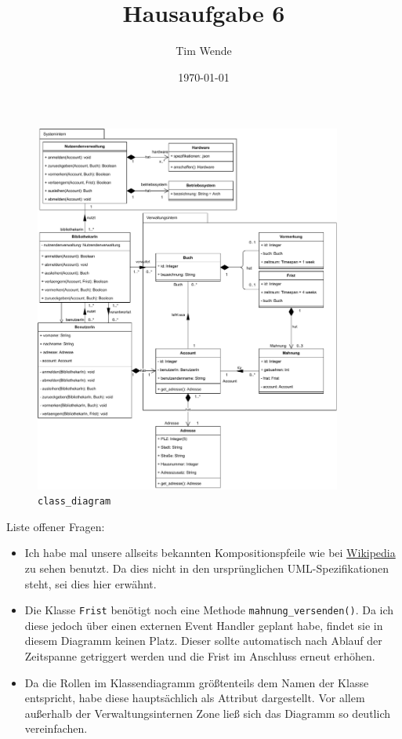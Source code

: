\documentclass{article}
\author{Tim Wende}
\date{\today}
\title{\textbf{Hausaufgabe 6}}
\begin{document}
    \maketitle

    \begin{figure}[ht]
        \includegraphics[width=0.9\textwidth]{swt_wende_tim_h06_class_diagram.pdf}
        \caption{\texttt{class\_diagram}}
    \end{figure}

    \newpage
    Liste offener Fragen:
    \begin{itemize}
        \item Ich habe mal unsere allseits bekannten Kompositionspfeile wie bei \href{https://de.wikipedia.org/wiki/Klassendiagramm}{Wikipedia} zu sehen benutzt.
            Da dies nicht in den ursprünglichen UML-Spezifikationen steht, sei dies hier erwähnt.
        \item Die Klasse \texttt{Frist} benötigt noch eine Methode \texttt{mahnung\_versenden()}.
            Da ich diese jedoch über einen externen Event Handler geplant habe, findet sie in diesem Diagramm keinen Platz.
            Dieser sollte automatisch nach Ablauf der Zeitspanne getriggert werden und die Frist im Anschluss erneut erhöhen.
        \item Da die Rollen im Klassendiagramm größtenteils dem Namen der Klasse entspricht, habe diese hauptsächlich als Attribut dargestellt.
            Vor allem außerhalb der Verwaltungsinternen Zone ließ sich das Diagramm so deutlich vereinfachen. 
    \end{itemize}
\end{document}
